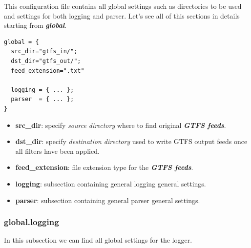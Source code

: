 \documentclass[12pt, a4paper]{book}
\begin{document}
\begin{justify}
This configuration file contains all global settings such as directories to be used and settings for both logging and parser.
Let's see all of this sections in details starting from \textbf{\textit{global}}.
\end{justify}

\begin{small}
\begin{lstlisting}[backgroundcolor=\color{gray},frame=single]
global = {
  src_dir="gtfs_in/";
  dst_dir="gtfs_out/";
  feed_extension=".txt"
 
  logging = { ... };
  parser  = { ... };
}
\end{lstlisting}  
\end{small}

\begin{itemize}
\item \textbf{src\_dir}: specify \textit{source directory} where to find original \textbf{\textit{GTFS feeds}}.
\item \textbf{dst\_dir}: specify \textit{destination directory} used to write GTFS output feeds once all filters have been applied.
\item \textbf{feed\_extension}: file extension type for the \textbf{\textit{GTFS feeds}}.
\item \textbf{logging}: subsection containing general logging general settings.
\item \textbf{parser}: subsection containing general parser general settings.
\end{itemize}

\newpage
\subsubsection{global.logging}

In this subsection we can find all global settings for the logger.
\end{document}

